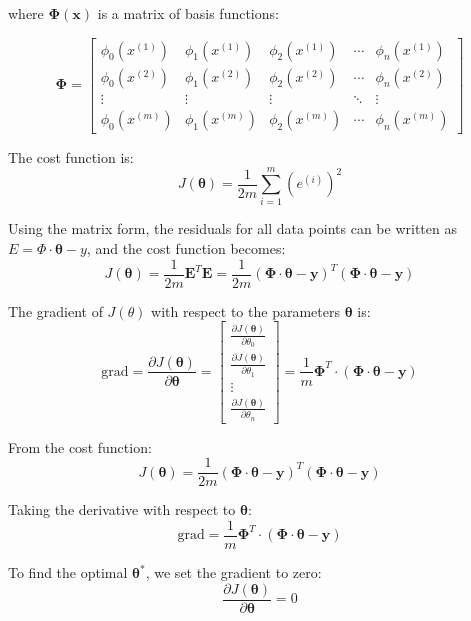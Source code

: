 where $\boldsymbol{\Phi}(\mathbf{x})$ is a matrix of basis functions:

\begin{equation}
    \boldsymbol{\Phi} =
\begin{bmatrix}
\phi_0(x^{(1)}) & \phi_1(x^{(1)}) & \phi_2(x^{(1)}) & \cdots & \phi_n(x^{(1)}) \\
\phi_0(x^{(2)}) & \phi_1(x^{(2)}) & \phi_2(x^{(2)}) & \cdots & \phi_n(x^{(2)}) \\
\vdots & \vdots & \vdots & \ddots & \vdots \\
\phi_0(x^{(m)}) & \phi_1(x^{(m)}) & \phi_2(x^{(m)}) & \cdots & \phi_n(x^{(m)})
\end{bmatrix}
\end{equation}

The cost function is:
\[
    J(\boldsymbol{\theta}) = \frac{1}{2m} \sum_{i=1}^m \left( e^{(i)} \right)^2
\]

Using the matrix form, the residuals for all data points can be written as \(E = \Phi \cdot \boldsymbol{\theta} - y\), and the cost function becomes:
\[
J(\boldsymbol{\theta}) = \frac{1}{2m} \mathbf{E}^T \mathbf{E} = \frac{1}{2m} (\boldsymbol{\Phi} \cdot \boldsymbol{\theta} - \mathbf{y})^T
(\boldsymbol{\Phi} \cdot \boldsymbol{\theta} - \mathbf{y})
\]

The gradient of \(J(\theta)\) with respect to the parameters \(\boldsymbol{\theta}\) is:
\[
\text{grad} = \frac{\partial J(\boldsymbol{\theta})}{\partial \boldsymbol{\theta}} =
\begin{bmatrix}
\frac{\partial J(\boldsymbol{\theta})}{\partial \theta_0} \\
\frac{\partial J(\boldsymbol{\theta})}{\partial \theta_1} \\
\vdots \\
\frac{\partial J(\boldsymbol{\theta})}{\partial \theta_n}
\end{bmatrix}
= \frac{1}{m} \boldsymbol{\Phi}^T \cdot (\boldsymbol{\Phi} \cdot \boldsymbol{\theta} - \mathbf{y})
\]



From the cost function:
\[
J(\boldsymbol{\theta}) = \frac{1}{2m} (\boldsymbol{\Phi} \cdot \boldsymbol{\theta} - \mathbf{y})^T (\boldsymbol{\Phi} \cdot \boldsymbol{\theta} - \mathbf{y})
\]

Taking the derivative with respect to \(\boldsymbol{\theta}\):
\[
\text{grad} = \frac{1}{m} \boldsymbol{\Phi}^T \cdot (\boldsymbol{\Phi} \cdot \boldsymbol{\theta} - \mathbf{y})
\]

To find the optimal \(\boldsymbol{\theta}^*\), we set the gradient to zero:
\[
\frac{\partial J(\boldsymbol{\theta})}{\partial \boldsymbol{\theta}} = 0
\]

